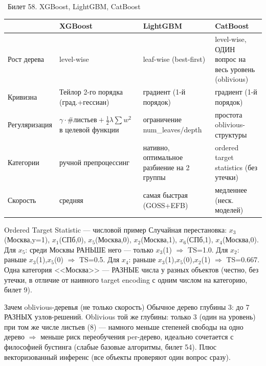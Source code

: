 \documentclass[12pt, a4paper]{article}
\newcommand{\bilet}[2]{%
  \vspace{10pt}%
  \noindent\colorbox{qcolor}{\parbox{\dimexpr\linewidth-2\fboxsep\relax}{%
    \color{white}\large\bfseries\strut\ Билет #1. #2%
  }}%
  \nopagebreak\vspace{5pt}\par\nopagebreak%
}
\begin{document}
\bilet{58}{XGBoost, LightGBM, CatBoost}

\begin{center}
\begin{tabular}{p{2.3cm}p{3.6cm}p{3.6cm}p{3.9cm}}
\toprule
 & \textbf{XGBoost} & \textbf{LightGBM} & \textbf{CatBoost} \\
\midrule
Рост дерева & level-wise & leaf-wise (best-first) & level-wise, ОДИН вопрос на весь уровень (oblivious) \\
Кривизна & Тейлор 2-го порядка (град.+гессиан) & градиент (1-й порядок) & градиент (1-й порядок) \\
Регуляризация & $\gamma\!\cdot\!\#\text{листьев}+\tfrac12\lambda\sum w^2$ в целевой функции & ограничение num\_leaves/depth & простота oblivious-структуры \\
Категории & ручной препроцессинг & нативно, оптимальное разбиение на 2 группы & ordered target statistics (без утечки) \\
Скорость & средняя & самая быстрая (GOSS+EFB) & медленнее (неск. моделей) \\
\bottomrule
\end{tabular}
\end{center}

\begin{exbox}{Ordered Target Statistic --- числовой пример}
Случайная перестановка: $x_3$(Москва,y=1), $x_1$(СПб,0), $x_5$(Москва,0), $x_2$(Москва,1), $x_6$(СПб,1), $x_4$(Москва,0). Для $x_5$: среди Москвы РАНЬШЕ него --- только $x_3$(1) $\Rightarrow$ TS=1.0. Для $x_2$: раньше $x_3$(1),$x_5$(0) $\Rightarrow$ TS=0.5. Для $x_4$: раньше $x_3$(1),$x_5$(0),$x_2$(1) $\Rightarrow$ TS=0.667. Одна категория <<Москва>> --- РАЗНЫЕ числа у разных объектов (честно, без утечки, в отличие от наивного target encoding с одним числом на категорию, билет 9).
\end{exbox}

\begin{propbox}{Зачем oblivious-деревья (не только скорость)}
Обычное дерево глубины 3: до 7 РАЗНЫХ узлов-решений. Oblivious той же глубины: только 3 (один на уровень) при том же числе листьев (8) --- намного меньше степеней свободы на одно дерево $\Rightarrow$ меньше риск переобучения per-дерево, идеально сочетается с философией бустинга (слабые базовые алгоритмы, билет 54). Плюс векторизованный инференс (все объекты проверяют один вопрос сразу).
\end{propbox}
\end{document}
